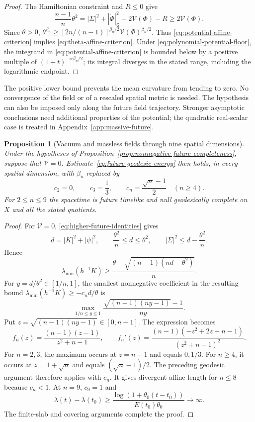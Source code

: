 \documentclass[10pt,a4paper]{article}
\numberwithin{equation}{section}
\newtheorem{proposition}[theorem]{Proposition}
\theoremstyle{definition}
\theoremstyle{remark}
\begin{document}
\begin{proof}
The Hamiltonian constraint and $R\le0$ give
\[
 \frac{n-1}{n}\theta^2
 =|\Sigma|^2+|\dot\Phi|_{\mathsf G}^2
   +2\mathcal V(\Phi)-R
 \ge2\mathcal V(\Phi).
\]
Since $\theta>0$,
$\theta^{\beta_n}\ge
[2n/(n-1)]^{\beta_n/2}\mathcal V(\Phi)^{\beta_n/2}$.
Thus \eqref{eq:potential-affine-criterion} implies
\eqref{eq:theta-affine-criterion}.  Under
\eqref{eq:polynomial-potential-floor}, the integrand in
\eqref{eq:potential-affine-criterion} is bounded below by a positive
multiple of $(1+t)^{-\alpha\beta_n/2}$; its integral diverges in the
stated range, including the logarithmic endpoint.
\end{proof}

The positive lower bound prevents the mean curvature from tending
to zero.  No convergence of the field or of a rescaled spatial
metric is needed.  The hypothesis can also be imposed only along
the future field trajectory.  Stronger asymptotic conclusions need
additional properties of the potential; the quadratic real-scalar
case is treated in Appendix~\ref{app:massive-future}.

\begin{proposition}[Vacuum and massless fields through nine spatial dimensions]
\label{prop:massless-future-completeness}
Under the hypotheses of
Proposition~\ref{prop:nonnegative-future-completeness}, suppose that
$\mathcal V=0$.  Estimate~\eqref{eq:future-geodesic-energy} then
holds, in every spatial dimension, with $\beta_n$ replaced by
\begin{equation}
 c_2=0,\qquad c_3=\frac13,\qquad
 c_n=\frac{\sqrt n-1}{2}\quad(n\ge4).
 \label{eq:massless-future-exponent}
\end{equation}
For $2\le n\le9$ the spacetime is future timelike and null
geodesically complete on $X$ and all the stated quotients.
\end{proposition}

\begin{proof}
For $\mathcal V=0$, \eqref{eq:higher-future-identities} gives
\begin{equation}
 d=|K|^2+|\psi|^2,\qquad
 \frac{\theta^2}{n}\le d\le\theta^2,\qquad
 |\Sigma|^2\le d-\frac{\theta^2}{n}.
 \label{eq:massless-expansion-constraint}
\end{equation}
Hence
\[
 \lambda_{\min}(h^{-1}K)
 \ge\frac{\theta-\sqrt{(n-1)(nd-\theta^2)}}{n}.
\]
For $y=d/\theta^2\in[1/n,1]$, the smallest nonnegative
coefficient in the resulting bound
$\lambda_{\min}(h^{-1}K)\ge-c_nd/\theta$ is
\[
 \max_{1/n\le y\le1}
 \frac{\sqrt{(n-1)(ny-1)}-1}{ny}.
\]
Put $z=\sqrt{(n-1)(ny-1)}\in[0,n-1]$.  The expression becomes
\[
 f_n(z)=\frac{(n-1)(z-1)}{z^2+n-1},\qquad
 f_n'(z)=\frac{(n-1)(-z^2+2z+n-1)}{(z^2+n-1)^2}.
\]
For $n=2,3$, the maximum occurs at $z=n-1$ and equals $0,1/3$.
For $n\ge4$, it occurs at $z=1+\sqrt n$ and equals
$(\sqrt n-1)/2$.  The preceding geodesic argument therefore
applies with $c_n$.  It gives divergent affine length for $n\le8$
because $c_n<1$.  At $n=9$, $c_9=1$ and
\[
 \lambda(t)-\lambda(t_0)
 \ge\frac{\log(1+\theta_0(t-t_0))}{E(t_0)\theta_0}
 \longrightarrow\infty.
\]
The finite-slab and covering arguments complete the proof.
\end{proof}
\end{document}
